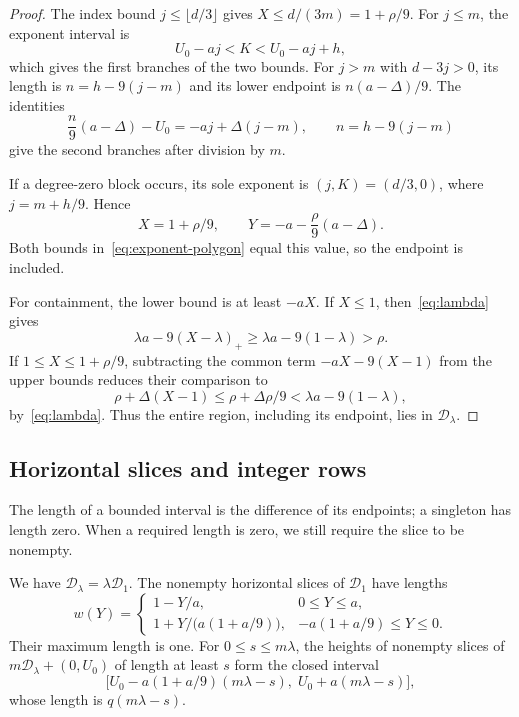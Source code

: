 \begin{proof}
The index bound $j\le\lfloor d/3\rfloor$ gives $X\le d/(3m)=1+\rho/9$. For $j\le m$, the exponent interval is
\[
 U_0-aj<K<U_0-aj+h,
\]
which gives the first branches of the two bounds. For $j>m$ with $d-3j>0$, its length is $n=h-9(j-m)$ and its lower endpoint is $n(a-\Delta)/9$. The identities
\[
 \frac n9(a-\Delta)-U_0=-aj+\Delta(j-m),
 \qquad n=h-9(j-m)
\]
give the second branches after division by $m$.

If a degree-zero block occurs, its sole exponent is $(j,K)=(d/3,0)$, where $j=m+h/9$. Hence
\[
 X=1+\rho/9,\qquad
 Y=-a-\frac\rho9(a-\Delta).
\]
Both bounds in~\eqref{eq:exponent-polygon} equal this value, so the endpoint is included.

For containment, the lower bound is at least $-aX$. If $X\le1$, then~\eqref{eq:lambda} gives
\[
 \lambda a-9(X-\lambda)_+
 \ge\lambda a-9(1-\lambda)>\rho.
\]
If $1\le X\le1+\rho/9$, subtracting the common term $-aX-9(X-1)$ from the upper bounds reduces their comparison to
\[
 \rho+\Delta(X-1)
 \le\rho+\Delta\rho/9
 <\lambda a-9(1-\lambda),
\]
by~\eqref{eq:lambda}. Thus the entire region, including its endpoint, lies in $\mathcal{D}_\lambda$.
\end{proof}

\subsection{Horizontal slices and integer rows}

The length of a bounded interval is the difference of its endpoints; a singleton has length zero. When a required length is zero, we still require the slice to be nonempty.

\begin{lemma}\label{lem:slice-profile}
We have $\mathcal{D}_\lambda=\lambda\mathcal{D}_1$. The nonempty horizontal slices of $\mathcal{D}_1$ have lengths
\[
 w(Y)=
 \begin{cases}
  1-Y/a,&0\le Y\le a,\\[1mm]
  1+Y/\bigl(a(1+a/9)\bigr),
       &-a(1+a/9)\le Y\le0.
 \end{cases}
\]
Their maximum length is one. For $0\le s\le m\lambda$, the heights of nonempty slices of $m\mathcal{D}_\lambda+(0,U_0)$ of length at least $s$ form the closed interval
\[
 \bigl[
 U_0-a(1+a/9)(m\lambda-s),\;
 U_0+a(m\lambda-s)
 \bigr],
\]
whose length is $q(m\lambda-s)$.
\end{lemma}

